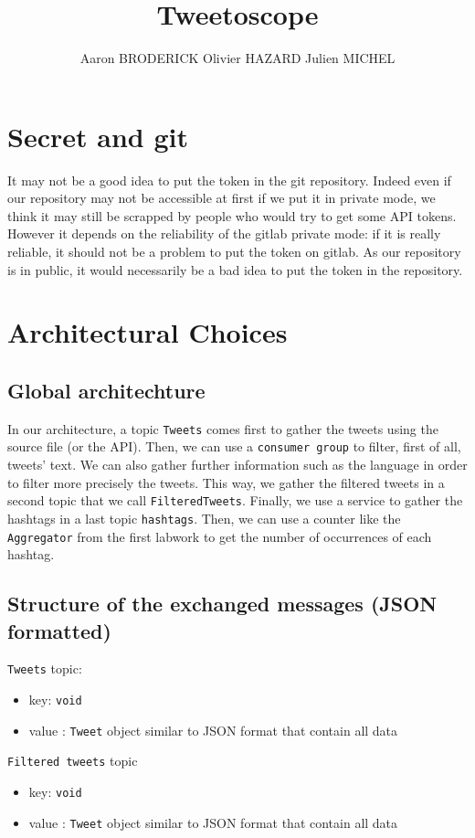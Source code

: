 \documentclass[10pt,a4paper]{article}
\author{Aaron BRODERICK Olivier HAZARD Julien MICHEL}
\title{Tweetoscope}
\begin{document}
\maketitle

\section{Secret and git}
\qquad 
It may not be a good idea to put the token in the git repository. Indeed even if our repository may not be accessible at first if we put it in private mode, we think it may still be scrapped by people who would try to get some API tokens. However it depends on the reliability of the gitlab private mode: if it is really reliable, it should not be a problem to put the token on gitlab. As our repository is in public, it would necessarily be a bad idea to put the token in the repository.

\section{Architectural Choices}
\subsection{Global architechture}
\qquad
In our architecture, a topic \texttt{Tweets} comes first to gather the tweets using the source file (or the API). Then, we can use a \texttt{consumer group} to filter, first of all, tweets' text. We can also gather further information such as the language in order to filter more precisely the tweets. This way, we gather the filtered tweets in a second topic that we call \texttt{FilteredTweets}. Finally, we use a service to gather the hashtags in a last topic \texttt{hashtags}. Then, we can use a counter like the \texttt{Aggregator} from the first labwork to get the number of occurrences of each hashtag.

\subsection{Structure of the exchanged messages (JSON formatted)}
\texttt{Tweets} topic:
\begin{itemize}
    \item key: \texttt{void}
    \item value : \texttt{Tweet} object similar to JSON format that contain all data
\end{itemize}

\texttt{Filtered tweets} topic
\begin{itemize}
    \item key: \texttt{void}
    \item value : \texttt{Tweet} object similar to JSON format that contain all data
\end{itemize}
\end{document}
